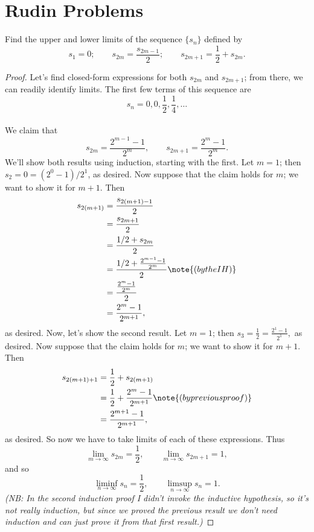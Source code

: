 \documentclass{assignment}
\begin{document}
\maketitle

\section*{Rudin Problems}
\begin{question}[4]
  Find the upper and lower limits of the sequence $\{s_n\}$ defined by $$s_1 = 0; \qquad 
s_{2m} = \frac{s_{2m - 1}}{2}; \qquad s_{2m + 1} = \frac{1}{2} + s_{2m}.$$
\end{question}
\begin{proof}
  Let's find closed-form expressions for both $s_{2m}$ and $s_{2m+1}$; from there, we can readily 
  identify limits. The first few terms of this sequence are $$s_n = 0, 0, \frac{1}{2}, \frac{1}{4}, \ldots$$\\
  
  We claim that $$s_{2m} = \frac{2^{m - 1} - 1}{2^{m}}, \qquad s_{2m + 1} = \frac{2^m - 1}{2^m}.$$
  We'll show both results using induction, starting with the first. Let $m = 1$; then $s_2 = 0 = 
  (2^0 - 1)/2^1$, as desired. Now suppose that the claim holds for $m$; we want to show it for $m+1$.
  Then 
  \begin{align*}
  s_{2(m+1)} &= \frac{s_{2(m+1) - 1}}{2} \\
             &= \frac{s_{2m + 1}}{2} \\
             &= \frac{1/2 + s_{2m}}{2} \\
             &= \frac{1/2 + \frac{2^{m-1} - 1}{2^{m}}}{2} \note{(by the IH)} \\
             &= \frac{\frac{2^{m} - 1}{2^{m}}}{2} \\
             &= \frac{2^{m} - 1}{2^{m + 1}},
  \end{align*}
  as desired. Now, let's show the second result. Let $m = 1$; then $s_3 = \frac{1}{2} = \frac{2^1 - 1}{2^1},$
  as desired. Now suppose that the claim holds for $m$; we want to show it for $m+1$. Then
  \begin{align*}
    s_{2(m+1) + 1} &= \frac{1}{2} + s_{2(m+1)} \\
                   &= \frac{1}{2} + \frac{2^{m} - 1}{2^{m + 1}} \note{(by previous proof)} \\
                   &= \frac{2^{m+1} - 1}{2^{m+1}},
  \end{align*}
  as desired. So now we have to take limits of each of these expressions. Thus
  $$\lim_{m\to\infty} s_{2m} = \frac{1}{2}, \qquad \lim_{m\to\infty} s_{2m + 1} = 1,$$ and so 
  $$\liminf_{n\to\infty} s_n = \frac{1}{2}, \qquad \limsup_{n\to\infty} s_n = 1.$$
  \emph{(NB: In the second induction proof I didn't invoke the inductive hypothesis, so it's not
    really induction, but since we proved the previous result we don't need induction and can just
  prove it from that first result.)}
\end{proof}
\end{document}
